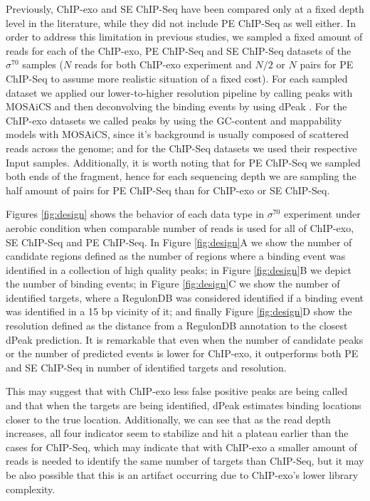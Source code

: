 \documentclass{bmcart}\usepackage[]{graphicx}\usepackage[]{color}
\newcommand{\sig}{\sigma^{70}}
\begin{document}
Previously, ChIP-exo and SE ChIP-Seq have been compared only at a
fixed depth level in the literature, while they did not include PE
ChIP-Seq as well either. In order to address this limitation in
previous studies, we sampled a fixed amount of reads for each of the
ChIP-exo, PE ChIP-Seq and SE ChIP-Seq datasets of the $\sig$ samples
($N$ reads for both ChIP-exo experiment and $N/2$ or $N$ pairs for PE
ChIP-Seq to assume more realistic situation of a fixed cost). For each
sampled dataset we applied our lower-to-higher resolution pipeline by
calling peaks with MOSAiCS \cite{mosaics} and then deconvolving the
binding events by using dPeak \cite{dpeak}. For the ChIP-exo datasets
we called peaks by using the GC-content and mappability models with
MOSAiCS, since it's background is usually composed of scattered reads
across the genome; and for the ChIP-Seq datasets we used their
respective Input samples. Additionally, it is worth noting that for PE
ChIP-Seq we sampled both ends of the fragment, hence for each
sequencing depth we are sampling the half amount of pairs for PE
ChIP-Seq than for ChIP-exo or SE ChIP-Seq.

Figures \ref{fig:design} shows the behavior of each data type in
$\sig$ experiment under aerobic condition when comparable number of
reads is used for all of ChIP-exo, SE ChIP-Seq and PE ChIP-Seq. In
Figure \ref{fig:design}A we show the number of candidate regions
defined as the number of regions where a binding event was identified
in a collection of high quality peaks; in Figure \ref{fig:design}B we
depict the number of binding events; in Figure \ref{fig:design}C we
show the number of identified targets, where a RegulonDB was
considered identified if a binding event was identified in a 15 bp
vicinity of it; and finally Figure \ref{fig:design}D show the
resolution defined as the distance from a RegulonDB annotation to the
closest dPeak prediction. It is remarkable that even when the number
of candidate peaks or the number of predicted events is lower for
ChIP-exo, it outperforms both PE and SE ChIP-Seq in number of
identified targets and resolution.

This may suggest that with ChIP-exo less false positive peaks are
being called and that when the targets are being identified, dPeak
estimates binding locations closer to the true location. Additionally,
we can see that as the read depth increases, all four indicator seem
to stabilize and hit a plateau earlier than the cases for ChIP-Seq,
which may indicate that with ChIP-exo a smaller amount of reads is
needed to identify the same number of targets than ChIP-Seq, but it
may be also possible that this is an artifact occurring due to
ChIP-exo's lower library complexity. 
\end{document}

